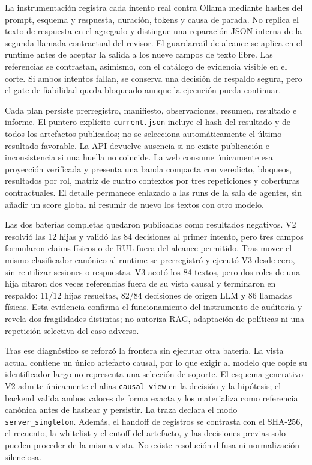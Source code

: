 La instrumentación registra cada intento real contra Ollama mediante hashes del
prompt, esquema y respuesta, duración, tokens y causa de parada. No replica el
texto de respuesta en el agregado y distingue una reparación JSON interna de la
segunda llamada contractual del revisor. El guardarraíl de alcance se aplica en
el runtime antes de aceptar la salida a los nueve campos de texto libre. Las
referencias se contrastan, asimismo, con el catálogo de evidencia visible en el
corte. Si ambos intentos fallan, se conserva una decisión de respaldo segura,
pero el gate de fiabilidad queda bloqueado aunque la ejecución pueda continuar.

Cada plan persiste prerregistro, manifiesto, observaciones, resumen, resultado e
informe. El puntero explícito \texttt{current.json} incluye el hash del resultado
y de todos los artefactos publicados; no se selecciona automáticamente el último
resultado favorable. La API devuelve ausencia si no existe publicación e
inconsistencia si una huella no coincide. La web consume únicamente esa
proyección verificada y presenta una banda compacta con veredicto, bloqueos,
resultados por rol, matriz de cuatro contextos por tres repeticiones y coberturas
contractuales. El detalle permanece enlazado a las runs de la sala de agentes,
sin añadir un score global ni resumir de nuevo los textos con otro modelo.

Las dos baterías completas quedaron publicadas como resultados negativos. V2
resolvió las 12 hijas y validó las 84 decisiones al primer intento, pero tres
campos formularon claims físicos o de RUL fuera del alcance permitido. Tras
mover el mismo clasificador canónico al runtime se prerregistró y ejecutó V3
desde cero, sin reutilizar sesiones o respuestas. V3 acotó los 84 textos, pero
dos roles de una hija citaron dos veces referencias fuera de su vista causal y
terminaron en respaldo: 11/12 hijas resueltas, 82/84 decisiones de origen LLM y
86 llamadas físicas. Esta evidencia confirma el funcionamiento del instrumento
de auditoría y revela dos fragilidades distintas; no autoriza RAG, adaptación de
políticas ni una repetición selectiva del caso adverso.

Tras ese diagnóstico se reforzó la frontera sin ejecutar otra batería. La vista
actual contiene un único artefacto causal, por lo que exigir al modelo que copie
su identificador largo no representa una selección de soporte. El esquema
generativo V2 admite únicamente el alias \texttt{causal\_view} en la decisión y
la hipótesis; el backend valida ambos valores de forma exacta y los materializa
como referencia canónica antes de hashear y persistir. La traza declara el modo
\texttt{server\_singleton}. Además, el handoff de registros se contrasta con el
SHA-256, el recuento, la whitelist y el cutoff del artefacto, y las decisiones
previas solo pueden proceder de la misma vista. No existe resolución difusa ni
normalización silenciosa.

